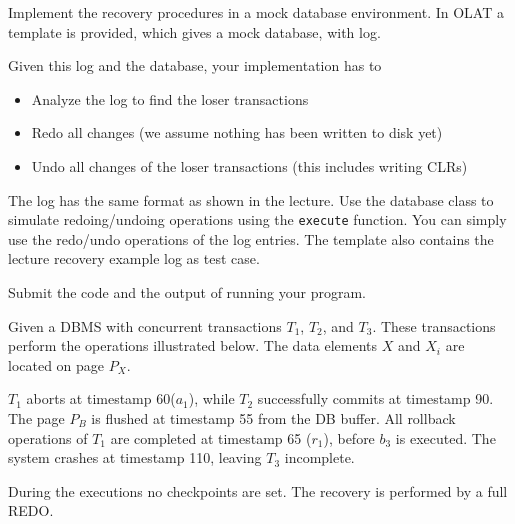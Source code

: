


\newcommand{\subtitle}{\textbf{Exercise 10}}
\newcommand{\outdate}{15.01.2024}
\newcommand{\duedate}{22.01.2024 12:00 MEZ}
\newcommand{\video}{056}





Implement the recovery procedures in a mock database environment.
In OLAT a template is provided, which gives a mock database, with log.

Given this log and the database, your implementation has to
\begin{itemize}
  \item Analyze the log to find the loser transactions
  \item Redo all changes (we assume nothing has been written to disk yet)
  \item Undo all changes of the loser transactions (this includes writing CLRs)
\end{itemize}

The log has the same format as shown in the lecture.
Use the database class to simulate redoing/undoing operations using the \verb+execute+ function.
You can simply use the redo/undo operations of the log entries.
The template also contains the lecture recovery example log as test case.

Submit the code and the output of running your program.


Given a DBMS with concurrent transactions $T_1$, $T_2$, and $T_3$. These transactions perform the operations illustrated below.
The data elements $X$ and $X_i$ are located on page $P_X$.

$T_1$ aborts at timestamp 60($a_1$), while $T_2$ successfully commits at timestamp 90.
The page $P_B$ is flushed at timestamp 55 from the DB buffer.
All rollback operations of $T_1$ are completed at timestamp 65 ($r_1$), before $b_3$ is executed.
The system crashes at timestamp 110, leaving $T_3$ incomplete.

During the executions no checkpoints are set.
The recovery is performed by a full REDO.

